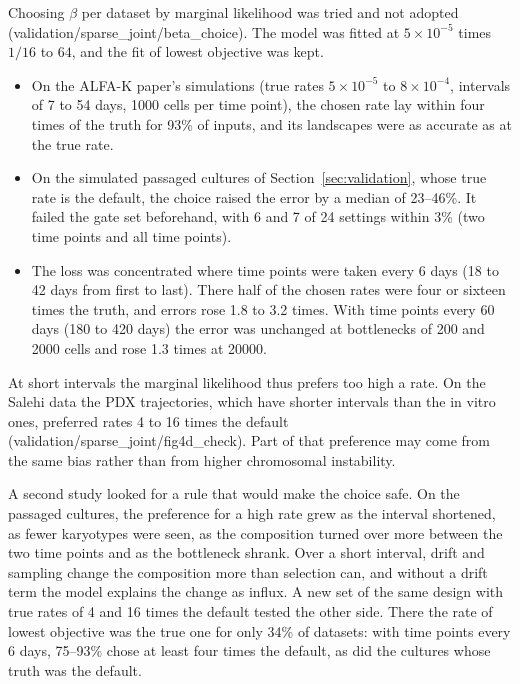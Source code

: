 \documentclass[11pt]{article}
\begin{document}
Choosing $\beta$ per dataset by marginal likelihood was tried and not adopted
(validation/sparse\_joint/beta\_choice). The model was fitted at
$5\times10^{-5}$ times $1/16$ to $64$, and the fit of lowest objective was
kept.
\begin{itemize}
\item On the ALFA-K paper's simulations (true rates $5\times10^{-5}$ to
  $8\times10^{-4}$, intervals of 7 to 54 days, 1000 cells per time point),
  the chosen rate lay within four times of the truth for 93\% of inputs,
  and its landscapes were as accurate as at the true rate.
\item On the simulated passaged cultures of
  Section~\ref{sec:validation}, whose true rate is the default, the choice
  raised the error by a median of 23--46\%. It failed the gate set
  beforehand, with 6 and 7 of 24 settings within 3\% (two time points and all time points).
\item The loss was concentrated where time points were taken every 6 days
  (18 to 42 days from first to last). There half of the chosen rates were
  four or sixteen times the truth, and errors rose 1.8 to 3.2 times. With
  time points every 60 days (180 to 420 days) the error was unchanged at
  bottlenecks of 200 and 2000 cells and rose 1.3 times at 20000.
\end{itemize}
At short intervals the marginal likelihood thus prefers too high a rate. On
the Salehi data the PDX trajectories, which have shorter intervals than the
in vitro ones, preferred rates 4 to 16 times the default
(validation/sparse\_joint/fig4d\_check). Part of that preference may come from
the same bias rather than from higher chromosomal instability.

A second study looked for a rule that would make the choice safe. On the
passaged cultures, the preference for a high rate grew as the interval
shortened, as fewer karyotypes were seen, as the composition turned over
more between the two time points and as the bottleneck shrank. Over a short
interval, drift and sampling change the composition more than selection
can, and without a drift term the model explains the change as influx. A
new set of the same design with true rates of 4 and 16 times the default
tested the other side. There the rate of lowest objective was the true one
for only 34\% of datasets: with time points every 6 days, 75--93\% chose
at least four times the default, as did the cultures whose truth was the
default.
\end{document}
